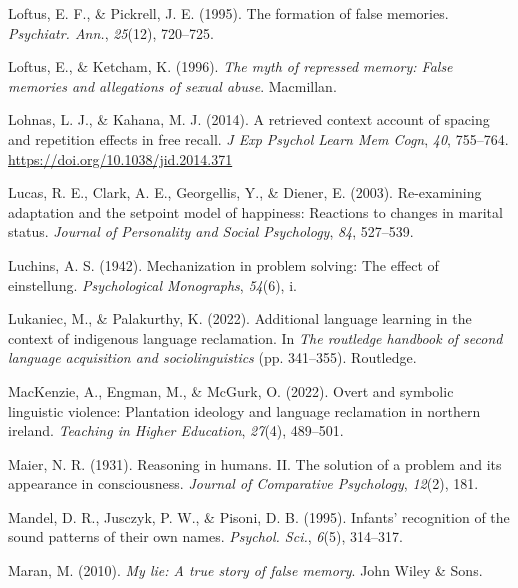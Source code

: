 \documentclass[
]{krantz}
\newlength{\cslhangindent}
\newlength{\cslentryspacingunit} %
\newenvironment{CSLReferences}[2] %
 {%
  \setlength{\parindent}{0pt}
  \ifodd #1
  \let\oldpar\par
  \def\par{\hangindent=\cslhangindent\oldpar}
  \fi
  \setlength{\parskip}{#2\cslentryspacingunit}
 }%
 {}
\begin{document}
\begin{CSLReferences}{1}{0}
\leavevmode{}%
Loftus, E. F., \& Pickrell, J. E. (1995). The formation of false memories. \emph{Psychiatr. Ann.}, \emph{25}(12), 720--725.

\leavevmode{}%
Loftus, E., \& Ketcham, K. (1996). \emph{The myth of repressed memory: False memories and allegations of sexual abuse}. Macmillan.

\leavevmode{}%
Lohnas, L. J., \& Kahana, M. J. (2014). A retrieved context account of spacing and repetition effects in free recall. \emph{J Exp Psychol Learn Mem Cogn}, \emph{40}, 755--764. \url{https://doi.org/10.1038/jid.2014.371}

\leavevmode{}%
Lucas, R. E., Clark, A. E., Georgellis, Y., \& Diener, E. (2003). Re-examining adaptation and the setpoint model of happiness: Reactions to changes in marital status. \emph{Journal of Personality and Social Psychology}, \emph{84}, 527--539.

\leavevmode{}%
Luchins, A. S. (1942). Mechanization in problem solving: The effect of einstellung. \emph{Psychological Monographs}, \emph{54}(6), i.

\leavevmode{}%
Lukaniec, M., \& Palakurthy, K. (2022). Additional language learning in the context of indigenous language reclamation. In \emph{The routledge handbook of second language acquisition and sociolinguistics} (pp. 341--355). Routledge.

\leavevmode{}%
MacKenzie, A., Engman, M., \& McGurk, O. (2022). Overt and symbolic linguistic violence: Plantation ideology and language reclamation in northern ireland. \emph{Teaching in Higher Education}, \emph{27}(4), 489--501.

\leavevmode{}%
Maier, N. R. (1931). Reasoning in humans. II. The solution of a problem and its appearance in consciousness. \emph{Journal of Comparative Psychology}, \emph{12}(2), 181.

\leavevmode{}%
Mandel, D. R., Jusczyk, P. W., \& Pisoni, D. B. (1995). Infants' recognition of the sound patterns of their own names. \emph{Psychol. Sci.}, \emph{6}(5), 314--317.

\leavevmode{}%
Maran, M. (2010). \emph{My lie: A true story of false memory}. John Wiley \& Sons.


\end{CSLReferences}
\end{document}
